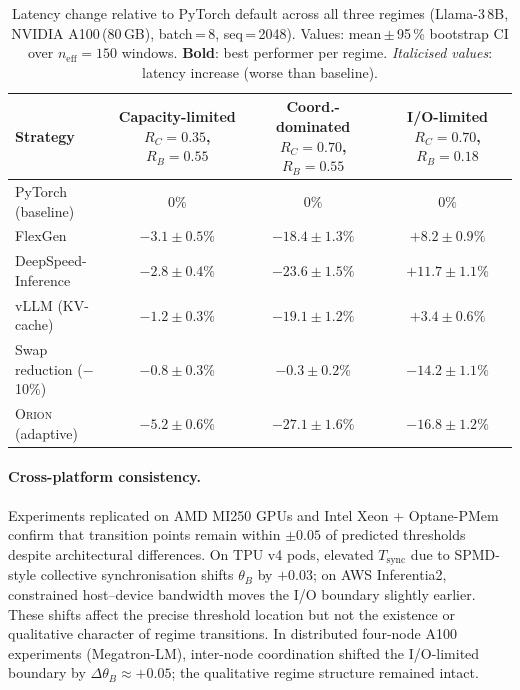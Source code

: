 \begin{table}[t]
\centering
\caption{Latency change relative to PyTorch default across all three regimes
         (Llama-3\,8B, NVIDIA A100\,(80\,GB), batch\,=\,8, seq\,=\,2048).
         Values: mean\,$\pm$\,95\,\% bootstrap CI over
         $n_{\mathrm{eff}}\!=\!150$ windows.
         \textbf{Bold}: best performer per regime.
         \emph{Italicised values}: latency increase (worse than baseline).}
\label{tab:regime_inversion}
\renewcommand{\arraystretch}{1.2}
\footnotesize
\begin{tabular}{lccc}
\toprule
\textbf{Strategy} &
  \makecell{\textbf{Capacity-limited}\\$R_C{=}0.35$, $R_B{=}0.55$} &
  \makecell{\textbf{Coord.-dominated}\\$R_C{=}0.70$, $R_B{=}0.55$} &
  \makecell{\textbf{I/O-limited}\\$R_C{=}0.70$, $R_B{=}0.18$} \\
\midrule
PyTorch (baseline)         & $0\%$              & $0\%$              & $0\%$ \\
FlexGen                    & $-3.1 \pm 0.5\%$  & $-18.4 \pm 1.3\%$ & $\mathit{+8.2 \pm 0.9\%}$ \\
DeepSpeed-Inference        & $-2.8 \pm 0.4\%$  & $-23.6 \pm 1.5\%$ & $\mathit{+11.7 \pm 1.1\%}$ \\
vLLM (KV-cache)            & $-1.2 \pm 0.3\%$  & $-19.1 \pm 1.2\%$ & $\mathit{+3.4 \pm 0.6\%}$ \\
Swap reduction ($-$10\%)   & $-0.8 \pm 0.3\%$  & $-0.3 \pm 0.2\%$  & $\mathbf{-14.2 \pm 1.1\%}$ \\
\textsc{Orion} (adaptive)  & $\mathbf{-5.2 \pm 0.6\%}$ & $\mathbf{-27.1 \pm 1.6\%}$ & $\mathbf{-16.8 \pm 1.2\%}$ \\
\bottomrule
\end{tabular}
\end{table}

\paragraph{Cross-platform consistency.}
Experiments replicated on AMD MI250 GPUs and Intel Xeon + Optane-PMem confirm
that transition points remain within $\pm 0.05$ of predicted thresholds despite
architectural differences.
On TPU v4 pods, elevated $T_{\mathrm{sync}}$ due to SPMD-style collective
synchronisation shifts $\theta_B$ by $+0.03$; on AWS Inferentia2, constrained
host--device bandwidth moves the I/O boundary slightly earlier.
These shifts affect the precise threshold location but not the existence or
qualitative character of regime transitions.
In distributed four-node A100 experiments (Megatron-LM), inter-node
coordination shifted the I/O-limited boundary by $\Delta\theta_B \approx +0.05$;
the qualitative regime structure remained intact.


